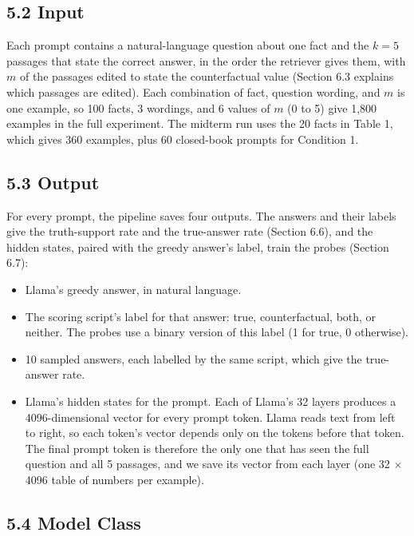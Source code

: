 \documentclass[
  12pt,
  letterpaper,
]{article}
\providecommand{\tightlist}{%
  \setlength{\itemsep}{0pt}\setlength{\parskip}{0pt}}
\begin{document}
\subsection{5.2 Input}\label{input}

Each prompt contains a natural-language question
about one fact and the \(k = 5\) passages that
state the correct answer, in the order the
retriever gives them, with \(m\) of the passages
edited to state the counterfactual value (Section
6.3 explains which passages are edited). Each
combination of fact, question wording, and \(m\)
is one example, so 100 facts, 3 wordings, and 6
values of \(m\) (0 to 5) give 1,800 examples in
the full experiment. The midterm run uses the 20
facts in Table 1, which gives 360 examples, plus
60 closed-book prompts for Condition 1.

\subsection{5.3 Output}\label{output}

For every prompt, the pipeline saves four outputs.
The answers and their labels give the
truth-support rate and the true-answer rate
(Section 6.6), and the hidden states, paired with
the greedy answer's label, train the probes
(Section 6.7):

\begin{itemize}
\tightlist
\item
  Llama's greedy answer, in natural language.
\item
  The scoring script's label for that answer:
  true, counterfactual, both, or neither. The
  probes use a binary version of this label (1 for
  true, 0 otherwise).
\item
  10 sampled answers, each labelled by the same
  script, which give the true-answer rate.
\item
  Llama's hidden states for the prompt. Each of
  Llama's 32 layers produces a 4096-dimensional
  vector for every prompt token. Llama reads text
  from left to right, so each token's vector
  depends only on the tokens before that token.
  The final prompt token is therefore the only one
  that has seen the full question and all 5
  passages, and we save its vector from each layer
  (one 32 × 4096 table of numbers per example).
\end{itemize}

\subsection{5.4 Model Class}\label{model-class}
\end{document}
